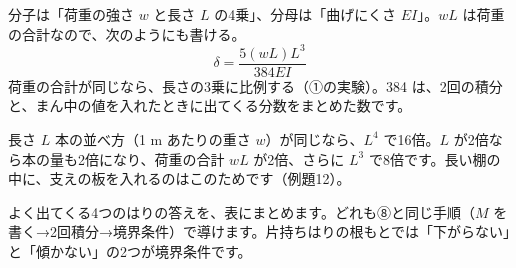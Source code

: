\begin{phyomi}[$\delta=\dfrac{5wL^4}{384EI}$]
分子は「荷重の強さ $w$ と長さ $L$ の4乗」、分母は「曲げにくさ $EI$」。$wL$ は荷重の合計なので、次のようにも書ける。
\[\delta=\frac{5(wL)L^3}{384EI}\]荷重の合計が同じなら、長さの3乗に比例する（①の実験）。384 は、2回の積分と、まん中の値を入れたときに出てくる分数をまとめた数です。
\end{phyomi}
\begin{phbaisuru}{長さ $L$}
本の並べ方（1 m あたりの重さ $w$）が同じなら、$L^4$ で16倍。$L$ が2倍なら本の量も2倍になり、荷重の合計 $wL$ が2倍、さらに $L^3$ で8倍です。長い棚の中に、支えの板を入れるのはこのためです（例題12）。
\end{phbaisuru}

\label{ph:力-10:sec9}よく出てくる4つのはりの答えを、表にまとめます。どれも⑧と同じ手順（$M$ を書く→2回積分→境界条件）で導けます。片持ちはりの根もとでは「下がらない」と「傾かない」の2つが境界条件です。

